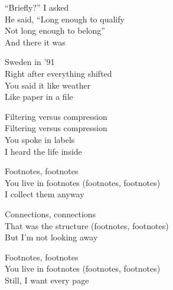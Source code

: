 \begin{lyrics}
“Briefly?” I asked\\
He said, “Long enough to qualify\\
Not long enough to belong”\\
And there it was

Sweden in ’91\\
Right after everything shifted\\
You said it like weather\\
Like paper in a file

Filtering versus compression\\
Filtering versus compression\\
You spoke in labels\\
I heard the life inside

Footnotes, footnotes\\
You live in footnotes
(footnotes, footnotes)\\
I collect them anyway

Connections, connections\\
That was the structure
(footnotes, footnotes)\\
But I’m not looking away

Footnotes, footnotes\\
You live in footnotes
(footnotes, footnotes)\\
Still, I want every page
\end{lyrics}

